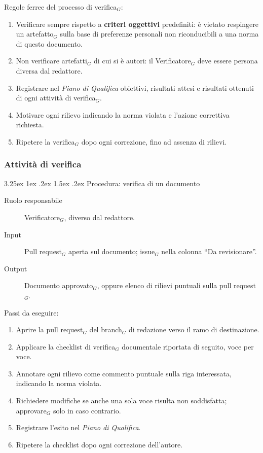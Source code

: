 \documentclass[a4paper, 10pt]{article}
\makeatletter
\renewcommand\paragraph{\@startsection{paragraph}{4}{\z@}%
  {3.25ex \@plus1ex \@minus .2ex}%
  {1.5ex \@plus .2ex}%
  {\normalfont\normalsize\bfseries}}
\makeatother
\begin{document}
\noindent Regole ferree del processo di verifica$_G$:
\begin{enumerate}
    \item Verificare sempre rispetto a \textbf{criteri oggettivi} predefiniti: è vietato respingere un artefatto$_G$ sulla base di preferenze personali non riconducibili a una norma di questo documento.
    \item Non verificare artefatti$_G$ di cui si è autori: il Verificatore$_G$ deve essere persona diversa dal redattore.
    \item Registrare nel \emph{Piano di Qualifica} obiettivi, risultati attesi e risultati ottenuti di ogni attività di verifica$_G$.
    \item Motivare ogni rilievo indicando la norma violata e l'azione correttiva richiesta.
    \item Ripetere la verifica$_G$ dopo ogni correzione, fino ad assenza di rilievi.
\end{enumerate}

\subsubsection{Attività di verifica}
\label{subsec:attivita_verifica}

\paragraph{Procedura: verifica di un documento}

\begin{description}
    \item[Ruolo responsabile] Verificatore$_G$, diverso dal redattore.
    \item[Input] Pull request$_G$ aperta sul documento; issue$_G$ nella colonna ``Da revisionare''.
    \item[Output] Documento approvato$_G$, oppure elenco di rilievi puntuali sulla pull request$_G$.
\end{description}

\noindent Passi da eseguire:
\begin{enumerate}
    \item Aprire la pull request$_G$ del branch$_G$ di redazione verso il ramo di destinazione.
    \item Applicare la checklist di verifica$_G$ documentale riportata di seguito, voce per voce.
    \item Annotare ogni rilievo come commento puntuale sulla riga interessata, indicando la norma violata.
    \item Richiedere modifiche se anche una sola voce risulta non soddisfatta; approvare$_G$ solo in caso contrario.
    \item Registrare l'esito nel \emph{Piano di Qualifica}.
    \item Ripetere la checklist dopo ogni correzione dell'autore.
\end{enumerate}
\end{document}
